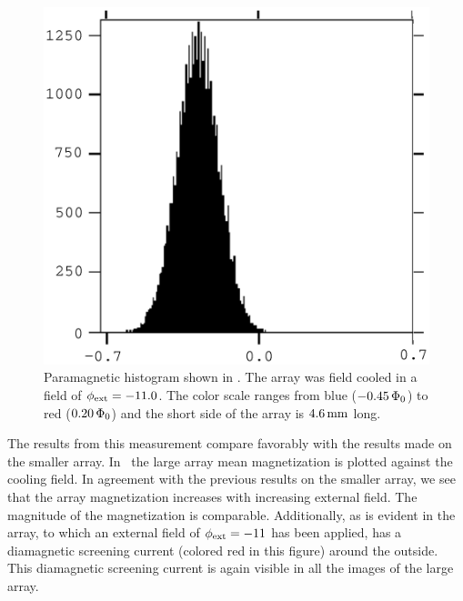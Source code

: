 \begin{figure}[p]
\includegraphics[width=5.7in]{figs/pme_exp/fig3_9_b_lg.ps}
\caption[Paramagnetic histogram shown in .]
{Paramagnetic histogram shown in .
The array was field cooled
in a field of $\phi_{\mathrm{ext}} = -11.0$. The color scale ranges from blue
($-0.45\,\Phi_0$) to red ($0.20\,\Phi_0$) and the short side of
the array is $4.6\,\mathrm{mm}$ long. }
\label{fig:lg_paramag_image_b}
\end{figure}



The results from this measurement compare favorably with the results
made on the smaller array. In \ the 
large array mean magnetization is plotted against the cooling field. 
In agreement with the previous results on the smaller array, we see that
the array magnetization increases with increasing external field.
The magnitude of the magnetization is comparable. Additionally,
as is evident in  the array, to which
an external field of $\phi_{\mathrm{ext}}=-11$ has been applied,  has a
diamagnetic screening current (colored red in this figure) 
around the outside. This diamagnetic screening
current is again visible in all the images of the large array. 

